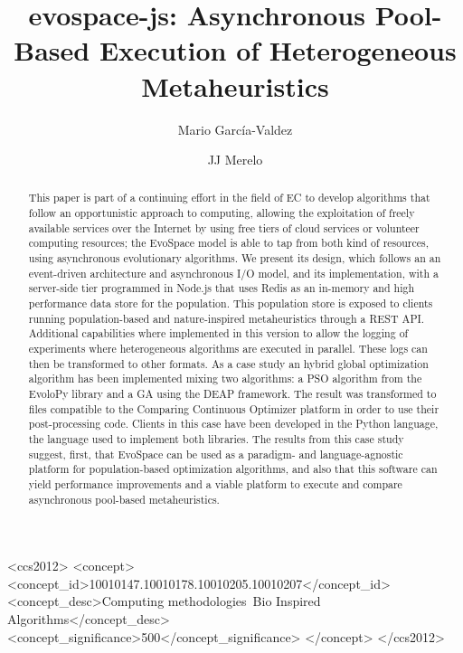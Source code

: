 \documentclass[sigconf]{acmart}
\begin{document}
\title{{\sf evospace-js}: Asynchronous Pool-Based Execution of Heterogeneous Metaheuristics}

\author{Mario Garc\'ia-Valdez}

\author{JJ Merelo}

\begin{abstract}

This paper is part of a continuing effort in the field of EC to
develop algorithms that follow an opportunistic approach to computing, allowing the exploitation
of freely available services over the Internet by using free tiers of
cloud services or volunteer computing
resources; the EvoSpace model is able to tap from both kind of
resources, using asynchronous evolutionary algorithms. We present its
design, which follows an an event-driven 
architecture and asynchronous I/O model, and its implementation, with
a server-side tier programmed in Node.js that uses Redis as an
in-memory and high performance data store for the population. This
population store is exposed to clients running population-based and nature-inspired metaheuristics
through a REST API. Additional capabilities where implemented in this version to
allow the logging of experiments where heterogeneous algorithms are executed in parallel.
These logs can then be transformed to other formats. As a case study
an hybrid global optimization algorithm has been implemented mixing
two algorithms: a PSO algorithm from the EvoloPy library and a GA using the DEAP framework.
The result was transformed to files compatible to the Comparing Continuous Optimizer platform
in order to use their post-processing code. Clients in this case have been developed in 
the Python language, the language used to implement both
libraries. The results from this case study suggest, first, that
EvoSpace can be used as a paradigm- and language-agnostic platform for
population-based optimization algorithms, and also that this software can yield
performance improvements and a viable platform to execute and compare asynchronous pool-based
metaheuristics.   
\end{abstract}

%
%
\begin{CCSXML}
<ccs2012>
<concept>
<concept_id>10010147.10010178.10010205.10010207</concept_id>
<concept_desc>Computing methodologies~Bio Inspired Algorithms</concept_desc>
<concept_significance>500</concept_significance>
</concept>
</ccs2012>
\end{CCSXML}



\maketitle




 
\end{document}
